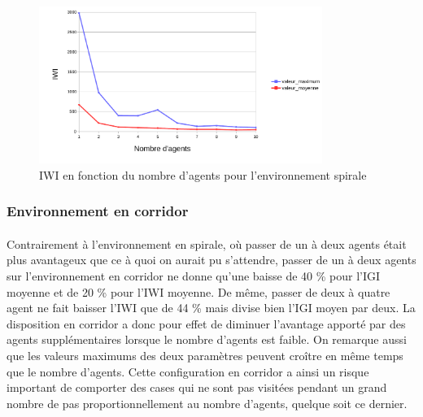 \documentclass{article}
\begin{document}
            \begin{figure}[!h]
                \begin{center}
                    \includegraphics[width = 0.82\textwidth]{graphes pdf/variance tortues IWI spirale.pdf}
                    \caption{IWI en fonction du nombre d'agents pour l'environnement spirale}
                \end{center}
            \end{figure}
            \newpage
        \subsubsection{Environnement en corridor}
            \paragraph{} Contrairement à l'environnement en spirale, où passer de un à deux agents était plus avantageux que ce à quoi on aurait pu s'attendre, passer de un à deux agents sur l'environnement en corridor ne donne qu'une baisse de 40 \% pour l'IGI moyenne et de 20 \% pour l'IWI moyenne.
            De même, passer de deux à quatre agent ne fait baisser l'IWI que de 44 \% mais divise bien l'IGI moyen par deux. La disposition en corridor a donc pour effet de diminuer l'avantage apporté par des agents supplémentaires lorsque le nombre d'agents est faible.
            On remarque aussi que les valeurs maximums des deux paramètres peuvent croître en même temps que le nombre d'agents. Cette configuration en corridor a ainsi un risque important de comporter des cases qui ne sont pas visitées pendant un grand nombre de pas proportionnellement au nombre d'agents, quelque soit ce dernier.
\end{document}
